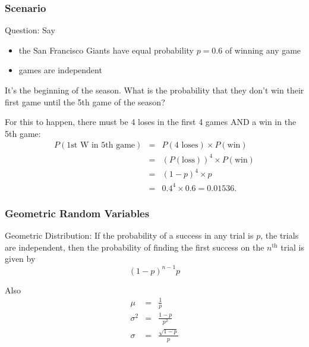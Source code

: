 \documentclass[slides]{beamer}
\newcommand{\blue}[1]{\textcolor{blue2}{#1}}
\begin{document}
\begin{frame}[fragile]
\frametitle{Scenario}

\blue{Question}:  Say
\begin{itemize}
\item the San Francisco Giants have equal probability $p=0.6$ of winning any game
\item games are independent
\end{itemize}

It's the beginning of the season.  What is the probability that they don't win their first game until the 5th game of the season?

\vspace{0.5cm}

\pause For this to happen, there must be 4 loses in the first 4 games AND a win in the 5th game:
\begin{eqnarray*}
P(\mbox{1st W in 5th game}) &=& P(\mbox{4 loses}) \times P(\mbox{win})\\
&=& (P(\mbox{loss}))^4 \times P(\mbox{win})\\
&=& (1-p)^4 \times p\\
&=& 0.4^4 \times 0.6 = 0.01536.
\end{eqnarray*}


\end{frame}


\begin{frame}[fragile]
\frametitle{Geometric Random Variables}

\blue{Geometric Distribution}: If the probability of a success in any trial is $p$, the trials are independent,
then the probability of finding the first success on the $n^{\mbox{th}}$ trial is given by
\[
(1-p)^{n-1}p
\]

\pause Also
\begin{eqnarray*}
\mu &=& \frac{1}{p}\\
\sigma^2 &=& \frac{1-p}{p^2}\\
\sigma &=& \frac{\sqrt{1-p}}{p}
\end{eqnarray*}


\end{frame}
\end{document}
